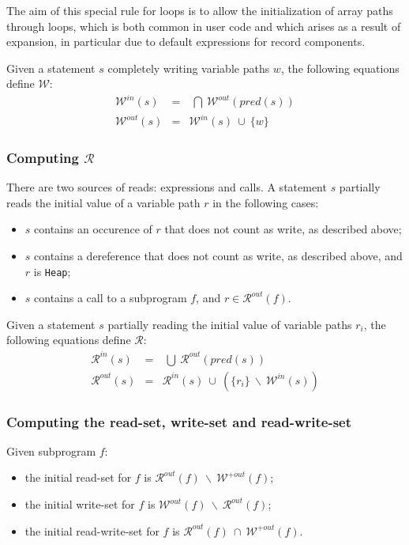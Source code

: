 \documentclass[fullpage]{article}
\newcommand{\code}[1]{\texttt{#1}}
\newcommand{\heap}{\code{Heap}\xspace}
\newcommand{\pred}[1]{\ensuremath{\mathit{pred}(#1)}\xspace}
\newcommand{\outallwrites}[1]{\ensuremath{\mathcal{W}^{+out}(#1)}\xspace}
\newcommand{\writes}{$\mathcal{W}$\xspace}
\newcommand{\inwrites}[1]{\ensuremath{\mathcal{W}^{in}(#1)}\xspace}
\newcommand{\outwrites}[1]{\ensuremath{\mathcal{W}^{out}(#1)}\xspace}
\newcommand{\reads}{$\mathcal{R}$\xspace}
\newcommand{\inreads}[1]{\ensuremath{\mathcal{R}^{in}(#1)}\xspace}
\newcommand{\outreads}[1]{\ensuremath{\mathcal{R}^{out}(#1)}\xspace}
\newcommand{\union}{~\cup~}
\newcommand{\bigunion}{~\bigcup~}
\newcommand{\inter}{~\cap~}
\newcommand{\biginter}{~\bigcap~}
\newcommand{\minus}{~\backslash~}
\begin{document}
The aim of this special rule for loops is to allow the initialization of array
paths through loops, which is both common in user code and which arises as a
result of expansion, in particular due to default expressions for record
components.

Given a statement $s$ completely writing variable paths $w$, the following
equations define \writes:
\begin{eqnarray*}
\inwrites{s} &=& \biginter \outwrites{\pred{s}}\\
\outwrites{s} &=& \inwrites{s} \union \{w\}
\end{eqnarray*}

\subsubsection{Computing \reads}

There are two sources of reads: expressions and calls. A statement $s$
partially reads the initial value of a variable path $r$ in the following
cases:
\begin{itemize}
\item $s$ contains an occurence of $r$ that does not count as write, as
  described above;
\item $s$ contains a dereference that does not count as write, as described
  above, and $r$ is \heap;
\item $s$ contains a call to a subprogram $f$, and $r \in \outreads{f}$.
\end{itemize}

Given a statement $s$ partially reading the initial value of variable paths
$r_i$, the following equations define \reads:
\begin{eqnarray*}
\inreads{s} &=& \bigunion \outreads{\pred{s}}\\
\outreads{s} &=& \inreads{s} \union (\{r_i\} \minus \inwrites{s})
\end{eqnarray*}

\subsubsection{Computing the read-set, write-set and read-write-set}

Given subprogram $f$:
\begin{itemize}
\item the initial read-set for $f$ is $\outreads{f} \minus \outallwrites{f}$;
\item the initial write-set for $f$ is $\outwrites{f} \minus \outreads{f}$;
\item the initial read-write-set for $f$ is $\outreads{f} \inter
  \outallwrites{f}$.
\end{itemize}
\end{document}
